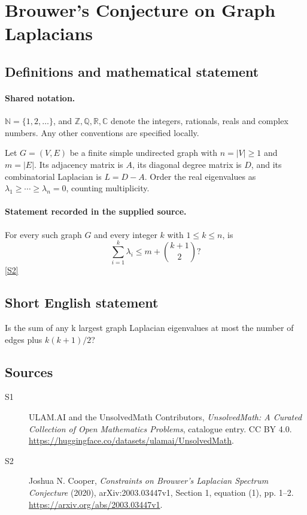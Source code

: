 \documentclass[11pt]{article}
\newcommand{\sref}[2]{\hyperlink{source:#1:#2}{[S#2]}}
\begin{document}
\section{Brouwer's Conjecture on Graph Laplacians}\label{statement}

\subsection{Definitions and mathematical statement}

\paragraph{Shared notation.}$\mathbb N=\{1,2,\ldots\}$, and $\mathbb Z,\mathbb Q,\mathbb R,\mathbb C$ denote the integers, rationals, reals and complex numbers. Any other conventions are specified locally.


Let $G=(V,E)$ be a finite simple undirected graph with $n=|V|\ge1$ and $m=|E|$. Its adjacency matrix is $A$, its diagonal degree matrix is $D$, and its combinatorial Laplacian is $L=D-A$. Order the real eigenvalues as $\lambda_1\ge\cdots\ge\lambda_n=0$, counting multiplicity.
\paragraph{Statement recorded in the supplied source.}
For every such graph $G$ and every integer $k$ with $1\le k\le n$, is
\[
 \sum_{i=1}^k\lambda_i\le m+\binom{k+1}{2}?
\]
\sref{statement}{2}
\subsection{Short English statement}
Is the sum of any k largest graph Laplacian eigenvalues at most the number of edges plus $k(k+1)/2$?
\subsection{Sources}
\begin{description}
\item[\hypertarget{source:statement:1}{S1}] ULAM.AI and the UnsolvedMath Contributors, \emph{UnsolvedMath: A Curated Collection of Open Mathematics Problems}, catalogue entry. CC BY 4.0. \url{https://huggingface.co/datasets/ulamai/UnsolvedMath}.
\item[\hypertarget{source:statement:2}{S2}] Joshua N. Cooper, \emph{Constraints on Brouwer's Laplacian Spectrum Conjecture} (2020), arXiv:2003.03447v1, Section 1, equation (1), pp. 1--2. \url{https://arxiv.org/abs/2003.03447v1}.
\end{description}
\label{end:statement}
\end{document}
